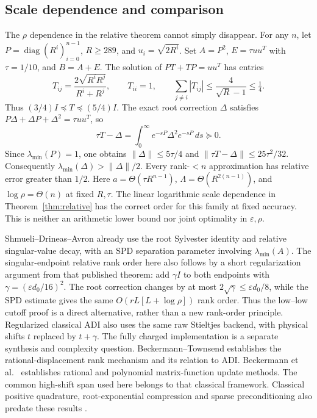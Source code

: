 \documentclass[11pt]{article}
\numberwithin{equation}{section}
\newcommand{\diag}{\operatorname{diag}}
\begin{document}
\subsection*{Scale dependence and comparison}

The $\rho$ dependence in the relative theorem cannot simply disappear.
For any $n$, let $P=\diag(R^i)_{i=0}^{n-1}$, $R\ge289$, and
$u_i=\sqrt{2R^i}$. Set $A=P^2$, $E=\tau uu^T$ with $\tau=1/10$,
and $B=A+E$. The solution of $PT+TP=uu^T$ has entries
\[
 T_{ij}=\frac{2\sqrt{R^iR^j}}{R^i+R^j},\qquad
 T_{ii}=1,\qquad
 \sum_{j\ne i}|T_{ij}|\le\frac4{\sqrt R-1}\le\tfrac14.
\]
Thus $(3/4)I\preceq T\preceq(5/4)I$. The exact root correction
$\Delta$ satisfies $P\Delta+\Delta P+\Delta^2=\tau uu^T$, so
\[
 \tau T-\Delta=\int_0^\infty e^{-sP}\Delta^2e^{-sP}\,ds\succeq0.
\]
Since $\lambda_{\min}(P)=1$, one obtains
$\|\Delta\|\le5\tau/4$ and
$\|\tau T-\Delta\|\le25\tau^2/32$. Consequently
$\lambda_{\min}(\Delta)>\|\Delta\|/2$. Every rank-$<n$ approximation
has relative error greater than $1/2$. Here
$a=\Theta(\tau R^{n-1})$, $\Lambda=\Theta(R^{2(n-1)})$, and
$\log\rho=\Theta(n)$ at fixed $R,\tau$. The linear logarithmic scale
dependence in Theorem~\ref{thm:relative} has the correct order for
this family at fixed accuracy. This is neither an arithmetic lower
bound nor joint optimality in $\varepsilon,\rho$.

Shmueli--Drineas--Avron \cite{SDA} already use the root Sylvester
identity and relative singular-value decay, with an SPD separation
parameter involving $\lambda_{\min}(A)$. The singular-endpoint relative
rank order here also follows by a short regularization argument from
that published theorem: add $\gamma I$ to both endpoints with
$\gamma=(\varepsilon d_0/16)^2$. The root correction changes by at
most $2\sqrt\gamma\le\varepsilon d_0/8$, while the SPD estimate gives
the same $O(rL[L+\log\rho])$ rank order. Thus the low--low cutoff
proof is a direct alternative, rather than a new rank-order principle.
Regularized classical ADI also uses the same raw Stieltjes backend,
with physical shifts $t$ replaced by $t+\gamma$. The fully charged
implementation is a separate synthesis and complexity question.
Beckermann--Townsend
\cite{BT} establishes the rational-displacement rank mechanism and
its relation to ADI. Beckermann et al.\ \cite{BCKS} establishes rational
and polynomial matrix-function update methods. The common high-shift
span used here belongs to that classical framework. Classical positive
quadrature, root-exponential compression and sparse preconditioning
also predate these results \cite{BKS,NN,FTU}.
\end{document}
